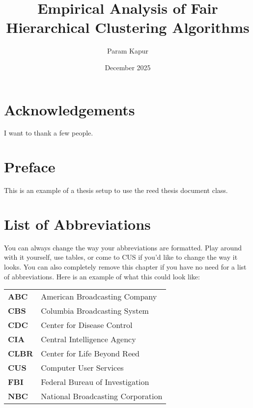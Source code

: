 \documentclass[12pt,twoside]{reedthesis}
\title{Empirical Analysis of Fair Hierarchical Clustering Algorithms}
\author{Param Kapur}
\date{December 2025}
\begin{document}
\maketitle
\frontmatter %
\pagestyle{empty} %

\chapter*{Acknowledgements}
I want to thank a few people.

\chapter*{Preface}
This is an example of a thesis setup to use the reed thesis document class.

\chapter*{List of Abbreviations}
You can always change the way your abbreviations are formatted. Play
around with it yourself, use tables, or come to CUS if you'd like to
change the way it looks. You can also completely remove this chapter
if you have no need for a list of abbreviations. Here is an example
of what this could look like:

\begin{table}[h]
  \centering %
  \begin{tabular}{ll}
    \textbf{ABC}    &  American Broadcasting Company \\
    \textbf{CBS}    &  Columbia Broadcasting System\\
    \textbf{CDC}    &  Center for Disease Control \\
    \textbf{CIA}    &  Central Intelligence Agency\\
    \textbf{CLBR}   &  Center for Life Beyond Reed\\
    \textbf{CUS}    &  Computer User Services\\
    \textbf{FBI}    &  Federal Bureau of Investigation\\
    \textbf{NBC}    &  National Broadcasting Corporation\\
  \end{tabular}
\end{table}
\end{document}
